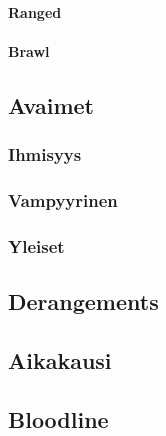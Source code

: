 \documentclass[a4paper, 12pt, finnish]{article}
\begin{document}
{			\paragraph{Ranged}
			\paragraph{Brawl}
	\subsection{Avaimet}
		\subsubsection{Ihmisyys}
		\subsubsection{Vampyyrinen}
		\subsubsection{Yleiset}
	\subsection{Derangements}
	\subsection{Aikakausi}
	\subsection{Bloodline}
}
\end{document}
